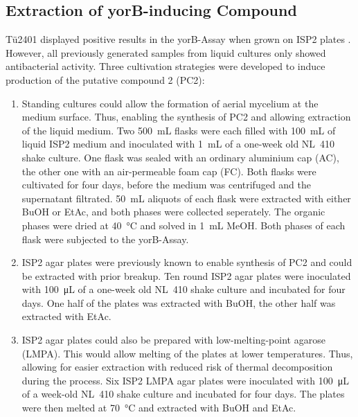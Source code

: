 
    \subsection{Extraction of yorB-inducing Compound} %
    \label{sub:extraction_of_yorb_inducing_compound}

    Tü2401 displayed positive results in the yorB-Assay  when grown on ISP2 plates .
    However, all previously generated samples from liquid cultures only showed antibacterial activity.
    Three cultivation strategies were developed to induce production of the putative compound 2 (PC2):

    \begin{enumerate}
        \item
	        Standing cultures could allow the formation of aerial mycelium at the medium surface.
	        Thus, enabling the synthesis of PC2 and allowing extraction of the liquid medium.
	        Two \SI{500}{\milli\liter} flasks were each filled with \SI{100}{\milli\liter} of liquid ISP2 medium and inoculated with \SI{1}{\milli\liter} of a one-week old NL~410 shake culture.
	        One flask was sealed with an ordinary aluminium cap (AC), the other one with an air-permeable foam cap (FC).
	        Both flasks were cultivated for four days, before the medium was centrifuged and the supernatant filtrated.
	        \SI{50}{\milli\liter} aliquots of each flask were extracted with either BuOH or EtAc, and both phases were collected seperately.
	        The organic phases were dried at \SI{40}{\celsius} and solved in \SI{1}{\milli\liter} MeOH.
	        Both phases of each flask were subjected to the yorB-Assay.
        \item
	        ISP2 agar plates were previously known to enable synthesis of PC2 and could be extracted with prior breakup.
	        Ten round ISP2 agar plates were inoculated with \SI{100}{\micro\liter} of a one-week old NL~410 shake culture and incubated for four days.
	        One half of the plates was extracted with BuOH, the other half was extracted with EtAc.
        \item
	        ISP2 agar plates could also be prepared with low-melting-point agarose (LMPA).
	        This would allow melting of the plates at lower temperatures.
	        Thus, allowing for easier extraction with reduced risk of thermal decomposition during the process.
	        Six ISP2 LMPA agar plates were inoculated with \SI{100}{\micro\liter} of a week-old NL~410 shake culture and incubated for four days.
	        The plates were then melted at \SI{70}{\celsius} and extracted with BuOH and EtAc.
    \end{enumerate}


